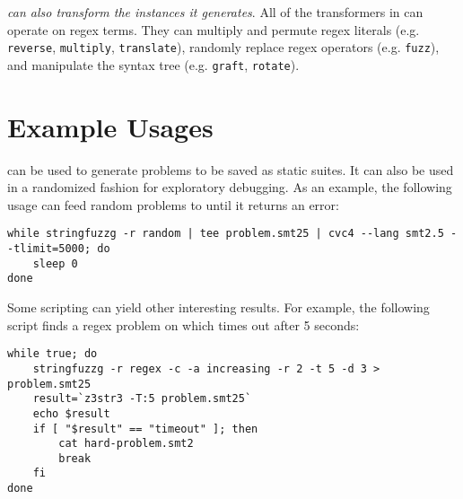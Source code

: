         {\it \fuzzer{} can also transform the instances it generates}. All of the transformers in \transformer{} can operate on regex terms. They can multiply and permute regex literals (e.g. \texttt{reverse}, \texttt{multiply}, \texttt{translate}), randomly replace regex operators (e.g. \texttt{fuzz}), and manipulate the syntax tree (e.g. \texttt{graft}, \texttt{rotate}).

        
\section{Example Usages}
\vspace{-0.1in}

        \fuzzer{} can be used to generate problems to be saved as static suites. It can also be used in a randomized fashion for exploratory debugging. As an example, the following usage can feed random problems to \cvc{} until it returns an error:
\begin{center}
\vspace{-0.05in}
\begin{varwidth}{\linewidth}
{\scriptsize\begin{verbatim}while stringfuzzg -r random | tee problem.smt25 | cvc4 --lang smt2.5 --tlimit=5000; do
    sleep 0
done
\end{verbatim}}
\end{varwidth}
\end{center}
        Some \unix{} scripting can yield other interesting results. For example, the following script finds a regex problem on which \us{} times out after 5 seconds:
\begin{center}
\vspace{-0.1in}
\begin{varwidth}{\linewidth}
        {\scriptsize\begin{verbatim}while true; do
    stringfuzzg -r regex -c -a increasing -r 2 -t 5 -d 3 > problem.smt25
    result=`z3str3 -T:5 problem.smt25`
    echo $result
    if [ "$result" == "timeout" ]; then
        cat hard-problem.smt2
        break
    fi
done\end{verbatim}}
\end{varwidth}
\end{center}
